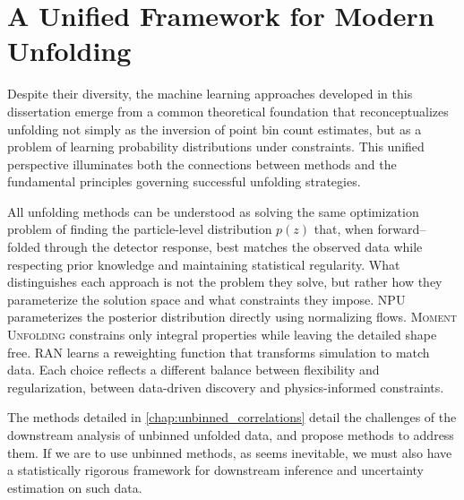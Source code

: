 \section{A Unified Framework for Modern Unfolding}
    Despite their diversity, the machine learning approaches developed in this dissertation emerge from a common theoretical foundation that reconceptualizes unfolding not simply as the inversion of point bin count estimates, but as a problem of learning probability distributions under constraints.
    This unified perspective illuminates both the connections between methods and the fundamental principles governing successful unfolding strategies.
    
    All unfolding methods can be understood as solving the same optimization problem of finding the particle-level distribution \(p(z)\) that, when forward--folded through the detector response, best matches the observed data while respecting prior knowledge and maintaining statistical regularity.
    What distinguishes each approach is not the problem they solve, but rather how they parameterize the solution space and what constraints they impose.
    NPU parameterizes the posterior distribution directly using normalizing flows.
    \textsc{Moment Unfolding} constrains only integral properties while leaving the detailed shape free.
    RAN learns a reweighting function that transforms simulation to match data.
    Each choice reflects a different balance between flexibility and regularization, between data-driven discovery and physics-informed constraints.

    The methods detailed in \cref{chap:unbinned_correlations} detail the challenges of the downstream analysis of unbinned unfolded data, and propose methods to address them.
    If we are to use unbinned methods, as seems inevitable, we must also have a statistically rigorous framework for downstream inference and uncertainty estimation on such data.

